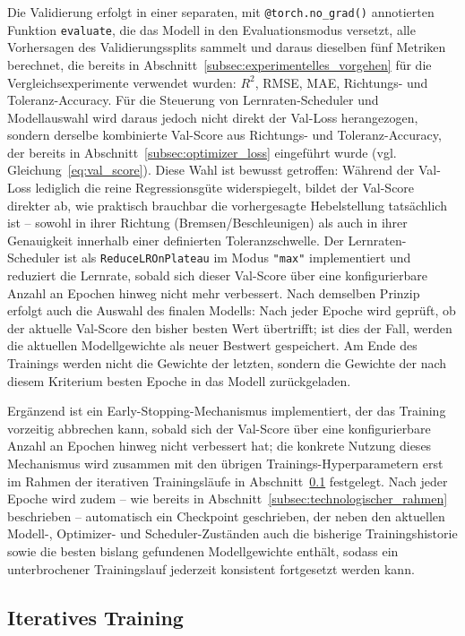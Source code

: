 Die Validierung erfolgt in einer separaten, mit \texttt{@torch.no\_grad()} annotierten Funktion \texttt{evaluate}, die das Modell in den Evaluationsmodus versetzt, alle Vorhersagen des Validierungssplits sammelt und daraus dieselben fünf Metriken berechnet, die bereits in Abschnitt~\ref{subsec:experimentelles_vorgehen} für die Vergleichsexperimente verwendet wurden: $R^2$, \gls{RMSE}, \gls{MAE}, Richtungs- und Toleranz-Accuracy. Für die Steuerung von Lernraten-Scheduler und Modellauswahl wird daraus jedoch nicht direkt der Val-Loss herangezogen, sondern derselbe kombinierte Val-Score aus Richtungs- und Toleranz-Accuracy, der bereits in Abschnitt~\ref{subsec:optimizer_loss} eingeführt wurde (vgl. Gleichung~\eqref{eq:val_score}). Diese Wahl ist bewusst getroffen: Während der Val-Loss lediglich die reine Regressionsgüte widerspiegelt, bildet der Val-Score direkter ab, wie praktisch brauchbar die vorhergesagte Hebelstellung tatsächlich ist -- sowohl in ihrer Richtung (Bremsen/Beschleunigen) als auch in ihrer Genauigkeit innerhalb einer definierten Toleranzschwelle. Der Lernraten-Scheduler ist als \texttt{ReduceLROnPlateau} im Modus \texttt{"max"} implementiert und reduziert die Lernrate, sobald sich dieser Val-Score über eine konfigurierbare Anzahl an Epochen hinweg nicht mehr verbessert. Nach demselben Prinzip erfolgt auch die Auswahl des finalen Modells: Nach jeder Epoche wird geprüft, ob der aktuelle Val-Score den bisher besten Wert übertrifft; ist dies der Fall, werden die aktuellen Modellgewichte als neuer Bestwert gespeichert. Am Ende des Trainings werden nicht die Gewichte der letzten, sondern die Gewichte der nach diesem Kriterium besten Epoche in das Modell zurückgeladen.

Ergänzend ist ein Early-Stopping-Mechanismus implementiert, der das Training vorzeitig abbrechen kann, sobald sich der Val-Score über eine konfigurierbare Anzahl an Epochen hinweg nicht verbessert hat; die konkrete Nutzung dieses Mechanismus wird zusammen mit den übrigen Trainings-Hyperparametern erst im Rahmen der iterativen Trainingsläufe in Abschnitt~\ref{subsec:iteratives_training} festgelegt. Nach jeder Epoche wird zudem -- wie bereits in Abschnitt~\ref{subsec:technologischer_rahmen} beschrieben -- automatisch ein Checkpoint geschrieben, der neben den aktuellen Modell-, Optimizer- und Scheduler-Zuständen auch die bisherige Trainingshistorie sowie die besten bislang gefundenen Modellgewichte enthält, sodass ein unterbrochener Trainingslauf jederzeit konsistent fortgesetzt werden kann.

\subsection{Iteratives Training}
\label{subsec:iteratives_training}


